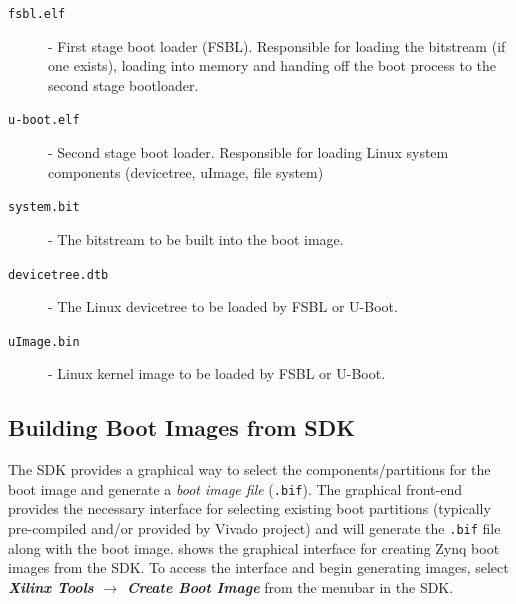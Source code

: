 
\begin{description}
	\item[\texttt{fsbl.elf}] - First stage boot loader (FSBL). Responsible for loading the bitstream (if one exists), loading into memory and handing off the boot process to the second stage bootloader.
	\item[\texttt{u-boot.elf}] - Second stage boot loader. Responsible for loading Linux system components (devicetree, uImage, file system)
	\item[\texttt{system.bit}] - The bitstream to be built into the boot image.
	\item[\texttt{devicetree.dtb}] - The Linux devicetree to be loaded by FSBL or U-Boot.
	\item[\texttt{uImage.bin}] - Linux kernel image to be loaded by FSBL or U-Boot.
\end{description}

\subsection{Building Boot Images from SDK}

The SDK provides a graphical way to select the components/partitions for the boot image and generate a \textit{boot image file} (\texttt{.bif}). The graphical front-end provides the necessary interface for selecting existing boot partitions (typically pre-compiled and/or provided by Vivado project) and will generate the \texttt{.bif} file along with the boot image.  shows the graphical interface for creating Zynq boot images from the SDK. To access the interface and begin generating images, select \textit{\bfseries Xilinx Tools $\rightarrow$ Create Boot Image} from the menubar in the SDK. \\

